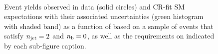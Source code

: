 \begin{figure}[h!]
\begin{center}
    \\
    \caption{Event yields observed in data (solid circles) and CR-fit SM expectations with their associated uncertainties (green histogram with shaded band) as a function of \HTmiss based on a sample of events that satisfy $n_{\text{jet}} = 2$ and $n_{\text{b}} = 0$, as well as the requirements on \scalht indicated by each sub-figure caption. }
    \label{fig:mhtdim_eq2j_eq0b}
  \end{center}
\end{figure}

